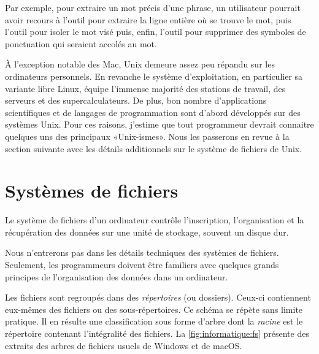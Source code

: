 Par exemple, pour extraire un mot précis d'une phrase, un utilisateur
pourrait avoir recours à l'outil  pour extraire la ligne
entière où se trouve le mot, puis l'outil  pour isoler le
mot visé puis, enfin, l'outil  pour supprimer des symboles
de ponctuation qui seraient accolés au mot.

À l'exception notable des Mac, Unix demeure assez peu
répandu sur les ordinateurs personnels. En revanche le système
d'exploitation, en particulier sa variante libre Linux,
équipe l'immense majorité des stations de travail, des serveurs et des
supercalculateurs. De plus, bon nombre d'applications scientifiques et
de langages de programmation sont d'abord développés sur des systèmes
Unix. Pour ces raisons, j'estime que tout programmeur devrait
connaitre quelques uns des principaux «Unix-ismes». Nous les passerons
en revue à la section suivante avec les détails additionnels sur le
système de fichiers de Unix.



\section{Systèmes de fichiers}
\label{sec:informatique:fs}

Le système de fichiers d'un ordinateur
contrôle l'inscription, l'organisation et la récupération des données
sur une unité de stockage, souvent un disque dur.

Nous n'entrerons pas dans les détails techniques des systèmes de
fichiers. Seulement, les programmeurs doivent être familiers avec
quelques grands principes de l'organisation des données dans un
ordinateur.

Les fichiers sont regroupés dans des %
\emph{répertoires} (ou dossiers). Ceux-ci
contiennent eux-mêmes des fichiers ou des sous-répertoires. Ce schéma
se répète sans limite pratique. Il en résulte une classification sous
forme d'arbre dont la \emph{racine} est le répertoire contenant
l'intégralité des fichiers. La \autoref{fig:informatique:fs} présente
des extraits des arbres de fichiers usuels de Windows
et de macOS.

